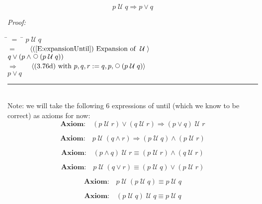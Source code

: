 \documentclass[fleqn, leqno]{article}
\newcommand{\lgap}{2pt}                             %
\newcommand{\mymathindent}{24pt}                    %
\newcommand{\Until}{\;\mathcal{U}\;}
\newcommand{\Next}{\;\,\text{\raisebox{3.5pt}{\circle{6}}}}
\newcommand{\myqed}{\hfill\rule[-.23ex]{1.2ex}{2.0ex}}
\newcommand{\Gll} {\langle}                         %
\newcommand{\Ggg} {\rangle}                         %
\newcommand{\Hint}[1]     {\ \ \ $\Gll              \mbox{#1} \Ggg$ }   %
\begin{document}
\begin{equation}\label{E:untilImpOr}
p \Until q \Rightarrow p \lor q
\end{equation}

\emph{Proof:}
\begin{tabbing}
\hspace{\mymathindent} \= $= \;$ \= \kill
  \> \>   $p \Until q$\\[\lgap]
  \> $=$  \>  \Hint{(\ref{E:expansionUntil}) Expansion of $\Until$}\\[\lgap]
  \> \>   $q \lor (p \land \Next(p \Until q))$\\[\lgap]
  \> $\Rightarrow$  \>  \Hint{(3.76d) with $p,q,r := q,p,\Next(p \Until q)$}\\[\lgap]
  \> \>   $p \lor q$\\[\lgap]
\end{tabbing}
\myqed\\[\lgap]


Note: we will take the following 6 expressions of until (which we know to be correct) as axioms for now:\\

\begin{equation}\label{E:untilOrImp}
\textbf{Axiom:}\quad (p \Until r) \lor (q \Until r) \Rightarrow (p \lor q) \Until r
\end{equation}

\begin{equation}\label{E:untilAndImp}
\textbf{Axiom:}\quad p \Until (q \land r) \Rightarrow (p \Until q) \land (p \Until r)
\end{equation}

\begin{equation}\label{E:untilAndEquiv}
\textbf{Axiom:}\quad (p \land q) \Until r \equiv (p \Until r) \land (q \Until r)
\end{equation}

\begin{equation}\label{E:untilOrEquiv}
\textbf{Axiom:}\quad p \Until (q \lor r) \equiv (p \Until q) \lor (p \Until r)
\end{equation}

\begin{equation}\label{E:untilIdem}
\textbf{Axiom:}\quad p \Until (p \Until q) \equiv p \Until q
\end{equation}

\begin{equation}\label{E:untilIdemR}
\textbf{Axiom:}\quad (p \Until q) \Until q \equiv p \Until q
\end{equation}
\end{document}

